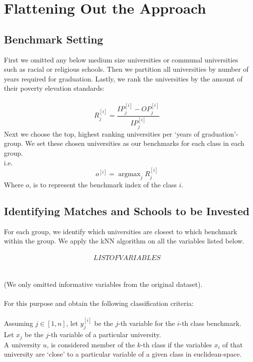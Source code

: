 \documentclass[12pt]{scrartcl}
\newcommand{\argmax}{\mathop{\mathrm{argmax}}}
\begin{document}
\section{Flattening Out the Approach}
	\subsection{Benchmark Setting}
	
	First we omitted any below medium size universities or communal universities such as racial or religious schools. Then we partition all universities by number of years required for graduation. Lastly, we rank the universities by the amount of their poverty elevation standards: \\ \\ 
	$$
		R_j^{[i]}=\frac{IP_j^{[i]}-OP_j^{[i]}}{IP_j^{[i]}}
	$$  
	Next we choose the top, highest ranking universities per `years of graduation'-group. We set these chosen universities as our benchmarks for each class in each group.\\
	
	i.e.
	$$
		o^{[i]} = \argmax_{j} R_j^{[i]}
	$$
	Where $o$, is to represent the benchmark index of the class $i$.

	\subsection{Identifying Matches and Schools to be Invested}
	
	For each group, we identify which universities are closest to which benchmark within the group. We apply the kNN algorithm on all the variables listed below.\\ \\
	\[LIST OF VARIABLES\]
	\\ \\
(We only omitted informative variables from the original dataset).\\ \\
For this purpose and obtain the following classification criteria:\\ \\
Assuming $j\in [1,n]$, let $y_j^{[i]}$ be the $j$-th variable for the $i$-th class benchmark.\\
Let $x_j$ be the $j$-th variable of a particular university.\\
	
A university $u$, is considered member of the $k$-th class if the variables $x_i$ of that university are `close' to a particular variable of a given class in euclidean-space.\\
	
\end{document}
